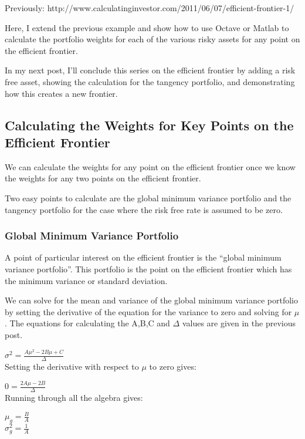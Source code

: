 \documentclass[12pt,a4paper]{article}
\begin{document}
Previously: http://www.calculatinginvestor.com/2011/06/07/efficient-frontier-1/

Here,  I extend the previous example and show how to use Octave or Matlab to calculate the portfolio weights for each of the various risky assets for any point on the efficient frontier.

In my next post, I’ll conclude this series on the efficient frontier by adding a risk free asset,  showing the calculation for the tangency portfolio, and demonstrating how this creates a new frontier.

\subsection{Calculating the Weights for Key Points on the Efficient Frontier}

We can calculate the weights for any point on the efficient frontier once we know the weights for any two points on the efficient frontier.

Two easy points to calculate are the global minimum variance portfolio and the tangency portfolio for the case where the risk free rate is assumed to be zero.

\subsubsection{Global Minimum Variance Portfolio}
A point of particular interest on the efficient frontier is the “global minimum variance portfolio”.  This portfolio is the point on the efficient frontier which has the minimum variance or standard deviation.

We can solve for the mean and variance of the global minimum variance portfolio by setting the derivative of the equation for the variance to zero and solving for $\mu$ .  The equations for calculating the A,B,C and $\Delta$ values are given in the previous post.

$\sigma^2=\frac{A\mu^2-2B\mu+C}{\Delta}$\\

Setting the derivative with respect to $\mu$ to zero gives:

$0=\frac{2A\mu-2B}{\Delta}$\\

Running through all the algebra gives:

$\mu_{g}=\frac{B}{A}$\\

$\sigma^{2}_{g}=\frac{1}{A}$\\
\end{document}
